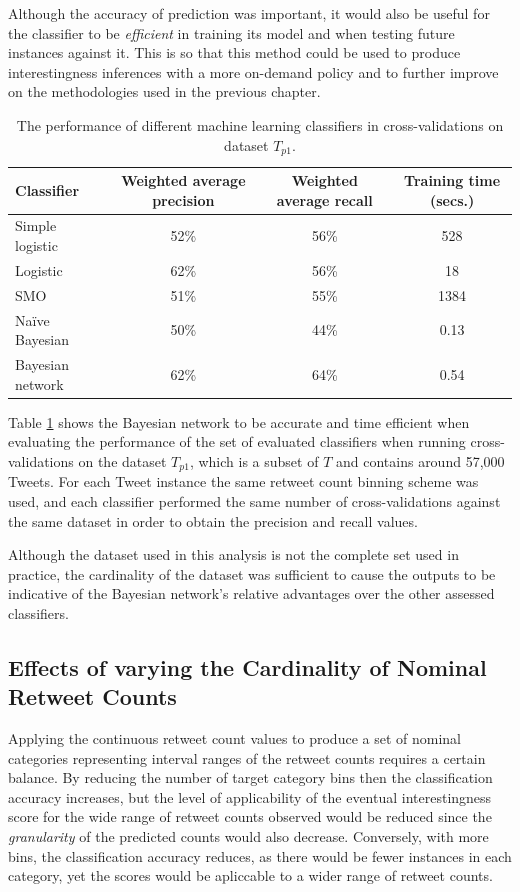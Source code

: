 Although the accuracy of prediction was important, it would also be useful for the classifier to be \textit{efficient} in training its model and when testing future instances against it. This is so that this method could be used to produce interestingness inferences with a more on-demand policy and to further improve on the methodologies used in the previous chapter.

\begin{table}[h]\footnotesize
\begin{center}
\begin{tabular}{ l | c | c | c }
	Classifier	& Weighted average precision & Weighted average recall &  Training time (secs.) \\
	\hline
	\hline 
	Simple logistic & 52\% &  56\% & 528\\
    Logistic        & 62\% &  56\% & 18\\
    SMO             & 51\% &  55\% & 1384\\
    Na\"{i}ve Bayesian & 50\% & 44\% & 0.13\\
    Bayesian network & 62\%&  64\% & 0.54\\
    \hline  
\end{tabular}
\end{center}
\caption{The performance of different machine learning classifiers in cross-validations on dataset $T_{p1}$.}
\label{table:classifierperformance}
\end{table}

Table \ref{table:classifierperformance} shows the Bayesian network to be accurate and time efficient when evaluating the performance of the set of evaluated classifiers when running cross-validations on the dataset $T_{p1}$, which is a subset of $T$ and contains around 57,000 Tweets.  For each Tweet instance the same retweet count binning scheme was used, and each classifier performed the same number of cross-validations against the same dataset in order to obtain the precision and recall values.

Although the dataset used in this analysis is not the complete set used in practice, the cardinality of the dataset was sufficient to cause the outputs to be indicative of the Bayesian network's relative advantages over the other assessed classifiers.


\subsection{Effects of varying the Cardinality of Nominal Retweet Counts}
\label{section:effects_of_varying_bin_sizes}
Applying the continuous retweet count values to produce a set of nominal categories representing interval ranges of the retweet counts requires a certain balance. By reducing the number of target category bins then the classification accuracy increases, but the level of applicability of the eventual interestingness score for the wide range of retweet counts observed would be reduced since the \textit{granularity} of the predicted counts would also decrease. Conversely, with more bins, the classification accuracy reduces, as there would be fewer instances in each category, yet the scores would be apliccable to a wider range of retweet counts.

